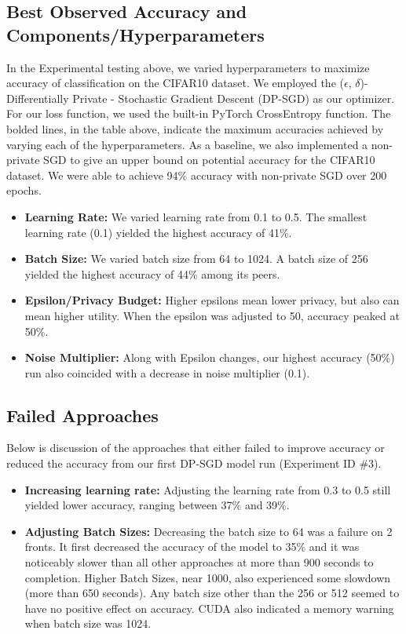 \subsection{Best Observed Accuracy and Components/Hyperparameters}\label{subsec:best-accuracy}
In the Experimental testing above, we varied hyperparameters to maximize accuracy of classification on the CIFAR10 dataset. We employed the
($\epsilon$, $\delta$)-Differentially Private - Stochastic Gradient Descent (DP-SGD) as our optimizer. For our loss function, we used the built-in PyTorch CrossEntropy function.
The bolded lines, in the table above, indicate the maximum accuracies achieved by varying each of the hyperparameters. As a baseline, we also implemented
a non-private SGD to give an upper bound on potential accuracy for the CIFAR10 dataset. We were able to achieve 94\% accuracy with non-private SGD over 200 epochs.
\begin{itemize}
    \item \textbf{Learning Rate:} We varied learning rate from 0.1 to 0.5. The smallest learning rate (0.1) yielded the highest accuracy of 41\%.
    \item \textbf{Batch Size:} We varied batch size from 64 to 1024. A batch size of 256 yielded the highest accuracy of 44\% among its peers.
    \item \textbf{Epsilon/Privacy Budget:} Higher epsilons mean lower privacy, but also can mean higher utility. When the epsilon was adjusted to 50, accuracy peaked at 50\%.
    \item \textbf{Noise Multiplier:} Along with Epsilon changes, our highest accuracy (50\%) run also coincided with a decrease in noise multiplier (0.1).
\end{itemize}

\subsection{Failed Approaches}\label{subsec:failed-approaches}
Below is discussion of the approaches that either failed to improve accuracy or reduced the accuracy from our first DP-SGD model run (Experiment ID \#3).

\begin{itemize}
    \item \textbf{Increasing learning rate:} Adjusting the learning rate from 0.3 to 0.5 still yielded lower accuracy, ranging between 37\% and 39\%.
    \item \textbf{Adjusting Batch Sizes:} Decreasing the batch size to 64 was a failure on 2 fronts. It first decreased the accuracy of the model to 35\% and it was noticeably slower than all other approaches at more than 900 seconds to completion. Higher Batch Sizes, near 1000, also experienced some slowdown (more than 650 seconds). Any batch size other than the 256 or 512 seemed to have no positive effect on accuracy. CUDA also indicated a memory warning when batch size was 1024.
\end{itemize}

